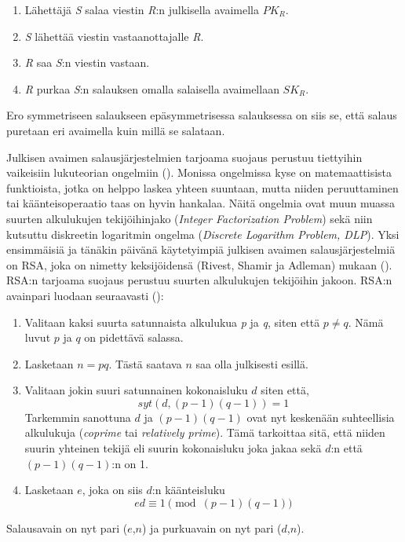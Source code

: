  \begin{enumerate}
     \item Lähettäjä \emph{S} salaa viestin \emph{R}:n julkisella avaimella $PK_{R}$.
     \item \emph{S} lähettää viestin vastaanottajalle \emph{R}.
     \item \emph{R} saa \emph{S}:n viestin vastaan.
     \item \emph{R} purkaa \emph{S}:n salauksen omalla salaisella avaimellaan $SK_{R}$.
 \end{enumerate}
Ero symmetriseen salaukseen epäsymmetrisessa salauksessa on siis se, että salaus puretaan eri avaimella kuin millä se salataan.
 
  Julkisen avaimen salausjärjestelmien tarjoama suojaus perustuu tiettyihin vaikeisiin lukuteorian ongelmiin (\cite{mavroeidis2018impact}). Monissa ongelmissa kyse on matemaattisista funktioista, jotka on helppo laskea yhteen suuntaan, mutta niiden peruuttaminen tai käänteisoperaatio taas on hyvin hankalaa. Näitä ongelmia ovat muun muassa suurten alkulukujen tekijöihinjako (\emph{Integer Factorization Problem}) sekä niin kutsuttu diskreetin logaritmin ongelma (\emph{Discrete Logarithm Problem, DLP}).
  Yksi ensimmäisiä ja tänäkin päivänä käytetyimpiä julkisen avaimen salausjärjestelmiä on RSA, joka on nimetty keksijöidensä (Rivest, Shamir ja Adleman) mukaan (\cite{montgomery1994survey}). RSA:n tarjoama suojaus perustuu suurten alkulukujen tekijöihin jakoon. RSA:n avainpari luodaan seuraavasti  (\cite{10.1145/359340.359342}):
  
  \begin{enumerate}
  
      \item Valitaan kaksi suurta satunnaista alkulukua \emph{p} ja \emph{q}, siten että $p \neq q$. Nämä luvut $p$ ja $q$ on pidettävä salassa.
      
      \item Lasketaan $n = pq$. Tästä saatava $n$ saa olla julkisesti esillä.
      
      \item Valitaan jokin suuri satunnainen kokonaisluku $d$ siten että,
      \[syt(d, (p-1)(q-1)) = 1\]
      Tarkemmin sanottuna $d$ ja $(p-1)(q-1)$ ovat nyt keskenään suhteellisia alkulukuja (\emph{coprime} tai \emph{relatively prime}). Tämä tarkoittaa sitä, että niiden suurin yhteinen tekijä eli suurin kokonaisluku joka jakaa sekä $d$:n että $(p-1)(q-1)$:n on 1.
      
      \item Lasketaan $e$, joka on siis $d$:n käänteisluku
      \[e d \equiv 1 \pmod{(p-1) (q-1)}\]
      
  \end{enumerate}
  Salausavain on nyt pari ($e$,$n$) ja purkuavain on nyt pari ($d$,$n$).
  
